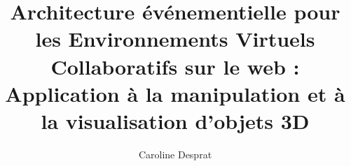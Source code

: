 \documentclass[final,12pt,oneside]{book}
\title{Architecture événementielle pour les Environnements Virtuels 
	Collaboratifs 
	sur le web : Application à la manipulation et à la 
	visualisation d'objets 3D}
\author{Caroline Desprat}
\begin{document}
	
	\maketitle
	\dominitoc
	\frontmatter
	\completetable
	
	\mainmatter















\backmatter


%	

\end{document}
